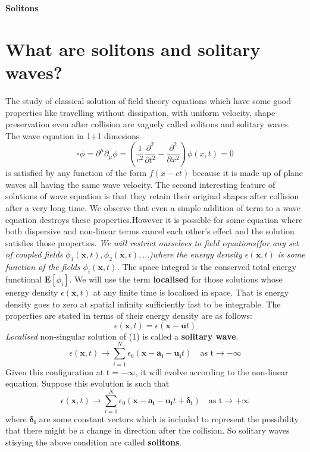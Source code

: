 \documentclass[a4paper, 12pt]{article}
\begin{document}
\begin{center} 
{\Huge{\textbf{Solitons}}}\\
\end{center}

\section {What are solitons and solitary waves?}
 The study of classical solution of field theory equations which have some good properties like travelling without dissipation, with uniform velocity, shape preservation even after collision are vaguely called solitons and solitary waves. The wave equation in 1+1 dimesions
  $$ \square \phi = \partial^{\mu}\partial_{\mu}\phi = \left(\frac{1}{c^2}\frac{\partial^2}{\partial t^2} - \frac{\partial^2}{\partial x^2} \right)\phi(x,t)=0$$
  is satisfied by any function of the form $f(x-ct)$ because it is made up of plane waves all having the same wave velocity. The second interesting feature of solutions of wave equation is that they retain their original shapes after collision after a very long time. We observe that even a simple addition of term to a wave equation destroys these properties.However it is possible for some equation where both dispersive and non-linear terms cancel each other's effect and the solution satisfies those properties. \textit{We will restrict ourselves to field equations(for any set of coupled fields $\phi_1(\bm x,t),\phi_2(\bm x,t),...$)where the energy density $\epsilon(\bm x,t)$ is some function of the fields $\phi_i(\bm x,t)$.} The space integral is the conserved total energy functional $\bm E[\phi_i]$. We will use the term \textbf{localised} for those solutions whose energy density $\epsilon(\bm x,t)$ at any finite time is localised in space. That is energy density goes to zero at spatial infinity sufficiently fast to be integrable. The properties are stated in terms of their energy density are as follows: 
 \begin{equation}%
 \epsilon(\bm x,t)=\epsilon(\bm x - \bm ut) 
 \end{equation}
\textit{ Localised }non-singular solution of (1) is called a \textbf{solitary wave}.
 \begin{equation}%
  \epsilon(\bm x,t) \to \sum_{i=1}^{N} \epsilon_0(\bm x -\bm{a_i} - \bm {u_i}t) \quad \textrm{as t} \to  -\infty
 \end{equation}
 Given this configuration at t$= -\infty$, it will evolve according to the non-linear equation. Suppose this evolution is such that 
  \begin{equation}%
  \epsilon(\bm x,t) \to \sum_{i=1}^{N} \epsilon_0(\bm x -\bm{a_i} - \bm {u_i}t + \bm{\delta_i}) \quad \textrm{as t} \to  +\infty
 \end{equation}
 where $\bm{\delta_i}$ are some constant vectors which is included to represent the possibility that there might be a change in direction after the collision. So solitary waves stisying the above condition are called \textbf{solitons}.
 
\end{document}
